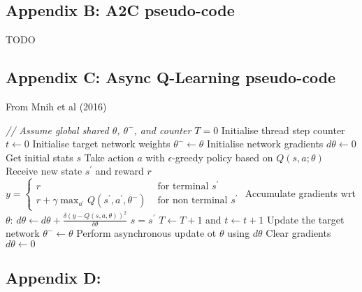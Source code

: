 \documentclass{article}
\begin{document}
\subsection*{Appendix B: A2C pseudo-code}
\label{async_a2c_pseudo}

\begin{algorithmic}[1]
\State TODO
\end{algorithmic}


\subsection*{Appendix C: Async Q-Learning pseudo-code}
\label{async_q_pseudo}

From Mnih et al (2016)

\begin{algorithmic}[1]
\State \textit{// Assume global shared  $\theta$, $\theta^{-}$, and counter $T = 0$}
\State Initialise thread step counter $t \gets 0$
\State Initialise target network weights $\theta^{-} \gets \theta$
\State Initialise network gradients $d\theta \gets 0$
\State Get initial stats $s$
    \State Take action $a$ with $\epsilon$-greedy policy based on $Q\left(s,a;\theta\right)$
    \State Receive new state $s^{\prime}$ and reward $r$
    \State $y= \begin{cases}r & \text { for terminal } s^{\prime} \\ r + \gamma \max _{a^{\prime}} Q\left(s^{\prime}, a^{\prime}, \theta^{-}\right) & \text { for non terminal } s^{\prime}\end{cases}$
    \State Accumulate gradients wrt $\theta$: $d\theta \gets d\theta + \frac{\delta\left( y-Q\left(s, a, \theta\right)\right)^{2}}{\delta\theta}$
    \State $s = s^{\prime}$
    \State $T \gets T + 1$ and $t \gets t + 1$
        \State Update the target network $\theta^{-} \gets \theta$
    \EndIf
        \State Perform asynchronous update ot $\theta$ using $d\theta$
        \State Clear gradients $d\theta \gets 0$
    \EndIf
\EndWhile

\end{algorithmic}


\subsection*{Appendix D: }
\end{document}
